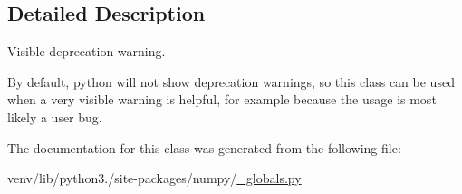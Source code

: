 \subsection{Detailed Description}
\begin{DoxyVerb}Visible deprecation warning.

By default, python will not show deprecation warnings, so this class
can be used when a very visible warning is helpful, for example because
the usage is most likely a user bug.\end{DoxyVerb}
 

The documentation for this class was generated from the following file\+:\begin{DoxyCompactItemize}
\item 
venv/lib/python3./site-\/packages/numpy/\hyperlink{__globals_8py}{\+\_\+globals.\+py}\end{DoxyCompactItemize}
